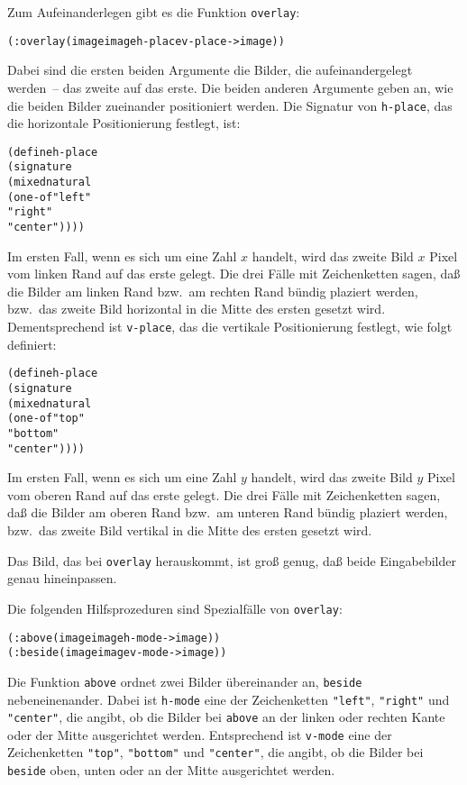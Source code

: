 Zum Aufeinanderlegen gibt es die Funktion \texttt{overlay}:
%
\begin{alltt}
(: overlay (image image h-place v-place -> image))
\end{alltt}
%
Dabei sind die ersten beiden Argumente die Bilder, die
aufeinandergelegt werden~-- das zweite auf das erste.
Die beiden anderen Argumente geben an, wie
die beiden Bilder zueinander positioniert werden.  Die Signatur
von \texttt{h-place}, das die horizontale Positionierung festlegt,
ist:
%
\begin{alltt}
(define h-place
   (signature
      (mixed natural
             (one-of "left"
                     "right"
                     "center"))))
\end{alltt}
%
Im ersten Fall, wenn es sich um eine Zahl $x$ handelt, wird das zweite
Bild $x$ Pixel vom linken Rand auf das erste gelegt.  Die drei
Fälle mit Zeichenketten sagen, daß die Bilder am linken Rand bzw.\ am
rechten Rand bündig plaziert werden, bzw.\ das zweite Bild horizontal
in die Mitte des ersten gesetzt wird.
Dementsprechend ist
\texttt{v-place}, das die vertikale Positionierung festlegt,
wie folgt definiert:
%
\begin{alltt}
(define h-place
   (signature
      (mixed natural
             (one-of "top"
                     "bottom"
                     "center"))))
\end{alltt}
%
Im ersten Fall, wenn es sich um eine Zahl $y$ handelt, wird das zweite
Bild $y$ Pixel vom oberen Rand auf das erste gelegt.  Die drei
Fälle mit Zeichenketten sagen, daß die Bilder am oberen Rand bzw.\ am
unteren Rand bündig plaziert werden, bzw.\ das zweite Bild vertikal
in die Mitte des ersten gesetzt wird.

Das Bild, das bei \texttt{overlay} herauskommt, ist groß genug, daß
beide Eingabebilder genau hineinpassen.

Die folgenden Hilfsprozeduren sind Spezialfälle von \texttt{overlay}:
%
\begin{alltt}
(: above  (image image h-mode -> image))
(: beside (image image v-mode -> image))
\end{alltt}
%
Die Funktion \texttt{above} ordnet zwei
Bilder übereinander an, \texttt{beside}
nebeneinenander.  Dabei ist \texttt{h-mode} eine der Zeichenketten
\verb|"left"|, \verb|"right"| und \verb|"center"|, die angibt, ob die
Bilder bei \texttt{above} an der linken oder rechten Kante oder der
Mitte ausgerichtet werden.  Entsprechend ist \texttt{v-mode} eine der
Zeichenketten \verb|"top"|, \verb|"bottom"| und \verb|"center"|, die
angibt, ob die Bilder bei \texttt{beside} oben, unten oder an der
Mitte ausgerichtet werden.


